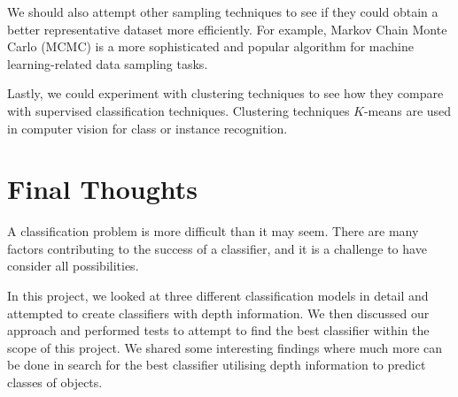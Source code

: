 We should also attempt other sampling techniques to see if they could obtain a better representative dataset more efficiently. For example, Markov Chain Monte Carlo (MCMC) is a more sophisticated and popular algorithm for machine learning-related data sampling tasks.

Lastly, we could experiment with clustering techniques to see how they compare with supervised classification techniques. Clustering techniques $K$-means are used in computer vision for class or instance recognition.

\section{Final Thoughts} \label{sec:conc-final}
A classification problem is more difficult than it may seem. There are many factors contributing to the success of a classifier, and it is a challenge to have consider all possibilities. 

In this project, we looked at three different classification models in detail and attempted to create classifiers with depth information. We then discussed our approach and performed tests to attempt to find the best classifier within the scope of this project. We shared some interesting findings where much more can be done in search for the best classifier utilising depth information to predict classes of objects.
